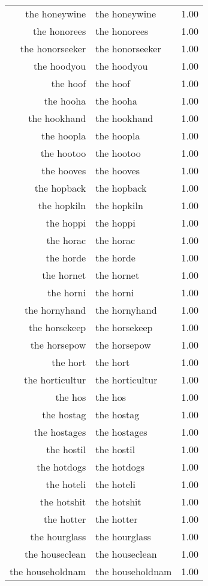 \begin{table}[ht]
\begin{tabular}{rlr}
  the honeywine & the honeywine & 1.00 \\ 
  the honorees & the honorees & 1.00 \\ 
  the honorseeker & the honorseeker & 1.00 \\ 
  the hoodyou & the hoodyou & 1.00 \\ 
  the hoof & the hoof & 1.00 \\ 
  the hooha & the hooha & 1.00 \\ 
  the hookhand & the hookhand & 1.00 \\ 
  the hoopla & the hoopla & 1.00 \\ 
  the hootoo & the hootoo & 1.00 \\ 
  the hooves & the hooves & 1.00 \\ 
  the hopback & the hopback & 1.00 \\ 
  the hopkiln & the hopkiln & 1.00 \\ 
  the hoppi & the hoppi & 1.00 \\ 
  the horac & the horac & 1.00 \\ 
  the horde & the horde & 1.00 \\ 
  the hornet & the hornet & 1.00 \\ 
  the horni & the horni & 1.00 \\ 
  the hornyhand & the hornyhand & 1.00 \\ 
  the horsekeep & the horsekeep & 1.00 \\ 
  the horsepow & the horsepow & 1.00 \\ 
  the hort & the hort & 1.00 \\ 
  the horticultur & the horticultur & 1.00 \\ 
  the hos & the hos & 1.00 \\ 
  the hostag & the hostag & 1.00 \\ 
  the hostages & the hostages & 1.00 \\ 
  the hostil & the hostil & 1.00 \\ 
  the hotdogs & the hotdogs & 1.00 \\ 
  the hoteli & the hoteli & 1.00 \\ 
  the hotshit & the hotshit & 1.00 \\ 
  the hotter & the hotter & 1.00 \\ 
  the hourglass & the hourglass & 1.00 \\ 
  the houseclean & the houseclean & 1.00 \\ 
  the householdnam & the householdnam & 1.00 \\ 

\end{tabular}
\end{table}
